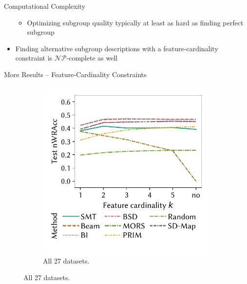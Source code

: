 \documentclass[en, navbaroff, handout]{sdqbeamer}
\begin{document}
\begin{frame}[t]{Computational Complexity}
\begin{itemize}
\begin{itemize}
			\item Optimizing subgroup quality typically at least as hard as finding perfect subgroup
		\end{itemize}
		\vspace{\baselineskip}
		\item Finding alternative subgroup descriptions with a feature-cardinality constraint is $\mathcal{NP}$-complete as well
	\end{itemize}
\end{frame}

\begin{frame}[t]{More Results -- Feature-Cardinality Constraints}
	\begin{figure}
		\centering
		\begin{subfigure}[t]{0.35\textwidth}
			\centering
			\includegraphics[width=\textwidth, trim=10 25 10 10, clip]{plots/csd-cardinality-test-nwracc-all-datasets.pdf}
			\caption{All 27 datasets.}
			\label{fig:csd:cardinality-test-nwracc-all-datasets}

\end{subfigure}
\end{figure}
\end{frame}
\end{document}
